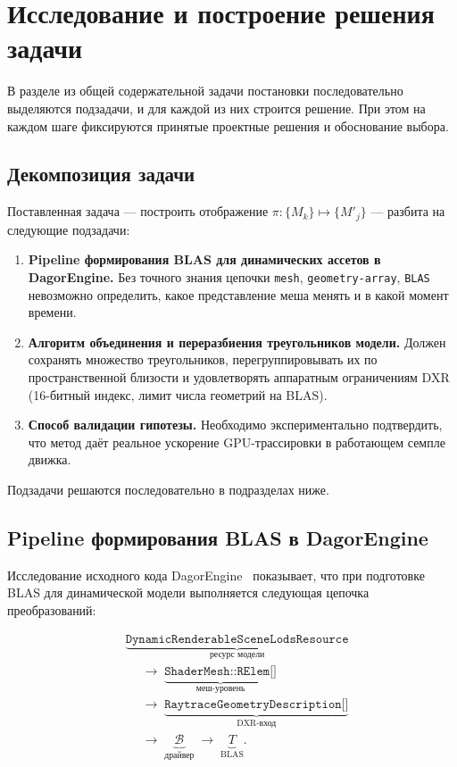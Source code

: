 \section{Исследование и построение решения задачи}
\label{sec:Chapter3} 

В разделе из общей содержательной задачи постановки
последовательно выделяются подзадачи, и для каждой из них строится
решение. При этом на каждом шаге фиксируются принятые проектные решения и
обоснование выбора.

\subsection{Декомпозиция задачи}

Поставленная задача --- построить отображение
$\pi: \{M_k\} \mapsto \{M'_j\}$ --- разбита на следующие
подзадачи:
\begin{enumerate}
    \item \textbf{Pipeline формирования BLAS для динамических
      ассетов в DagorEngine.} Без точного знания цепочки
      \texttt{mesh}, \texttt{geometry-array}, \texttt{BLAS}
      невозможно определить, какое представление меша менять
      и в какой момент времени.
    \item \textbf{Алгоритм объединения и переразбиения
      треугольников модели.} Должен сохранять множество
      треугольников, перегруппировывать их по пространственной
      близости и удовлетворять аппаратным ограничениям DXR
      (16-битный индекс, лимит числа геометрий на BLAS).
    \item \textbf{Способ валидации гипотезы.} Необходимо
      экспериментально подтвердить, что метод даёт реальное
      ускорение GPU-трассировки в работающем семпле движка.
\end{enumerate}

Подзадачи решаются последовательно в
подразделах ниже.

\subsection{Pipeline формирования BLAS в DagorEngine}
\label{ssec:p1}

Исследование исходного кода DagorEngine~\cite{dagorEngine} показывает,
что при подготовке BLAS для динамической модели выполняется следующая
цепочка преобразований:

\begin{equation}
\begin{split}
&\underbrace{\texttt{DynamicRenderableSceneLodsResource}}_{\text{ресурс модели}} \\
&\quad\;\to\; \underbrace{\texttt{ShaderMesh::RElem[]}}_{\text{меш-уровень}} \\
&\quad\;\to\; \underbrace{\texttt{RaytraceGeometryDescription[]}}_{\text{DXR-вход}} \\
&\quad\;\to\; \underbrace{\mathcal{B}}_{\text{драйвер}} \;\to\; \underbrace{T}_{\text{BLAS}}.
\end{split}
\label{eq:pipeline}
\end{equation}

